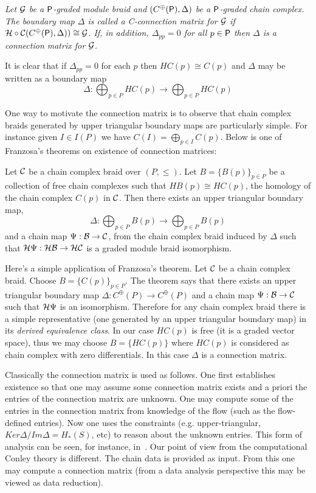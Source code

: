 \begin{defn}
{\em
Let ${\mathcal G}$ be a ${\mathsf P}$-graded module braid and $(C^\oplus({\mathsf P}),\Delta)$ be a ${\mathsf P}$-graded chain complex.  The boundary map $\Delta$ is called a {\em C-connection matrix for} ${\mathcal G}$ if ${\mathcal H}\circ {\mathcal C}(C^\oplus({\mathsf P}),\Delta))\cong {\mathcal G}$.  If, in addition, $\Delta_{pp}=0$ for all $p\in {\mathsf P}$ then $\Delta$ is a {\em connection matrix for} ${\mathcal G}$.
}
\end{defn}

It is clear that if $\Delta_{pp}=0$ for each $p$ then $HC(p)\cong C(p)$ and $\Delta$ may be written as a boundary map $$\Delta:\bigoplus_{p\in P} HC(p)\to \bigoplus_{p\in P} HC(p)$$

One way to motivate the connection matrix is to observe that chain complex braids generated by upper triangular boundary maps are particularly simple.  For instance given $I\in I(P)$ we have $C(I) = \bigoplus_{p\in I} C(p)$.  Below is one of Franzosa's theorems on existence of connection matrices:

\begin{thm}
Let ${\mathcal C}$ be a chain complex braid over $(P,\leq)$.  Let $B=\{B(p)\}_{p\in P}$ be a collection of free chain complexes such that $HB(p) \cong HC(p)$, the homology of the chain complex $C(p)$ in ${\mathcal C}$.  Then there exists an upper triangular boundary map, $$\Delta:\bigoplus_{p\in P} B(p)\to \bigoplus_{p\in P}B(p)$$ and a chain map $\Psi:{\mathcal B}\to {\mathcal C}$, from the chain complex braid induced by $\Delta$ such that ${\mathcal H}\Psi:{\mathcal H}{\mathcal B}\to {\mathcal H}{\mathcal C}$ is a graded module braid isomorphism.
\end{thm}

Here's a simple application of Franzosa's theorem.  Let ${\mathcal C}$ be a chain complex braid.  Choose $B = \{C(p)\}_{p\in P}$.  The theorem says that there exists an upper triangular boundary map $\Delta:C^\oplus(P)\to C^\oplus(P)$ and a chain map $\Psi:{\mathcal B}\to {\mathcal C}$ such that ${\mathcal H}\Psi$ is an isomorphism.  Therefore for any chain complex braid there is a simple representative (one generated by an upper triangular boundary map) in its {\em derived equivalence class}.  In our case $HC(p)$ is free (it is a graded vector space), thus we may choose $B=\{HC(p)\}$ where $HC(p)$ is considered as chain complex with zero differentials.  In this case $\Delta$ is a connection matrix.


\begin{rem}
Classically the connection matrix is used as follows.  One first establishes existence so that one may assume some connection matrix exists and a priori the entries of the connection matrix are unknown.  One may compute some of the entries in the connection matrix from knowledge of the flow (such as the flow-defined entries).  Now one uses the constraints (e.g. upper-triangular, $Ker\Delta/Im\Delta = H_*(S)$, etc) to reason about the unknown entries.  This form of analysis can be seen, for instance, in~\cite{}.  Our point of view from the computational Conley theory is different.  The chain data is provided as input.  From this one may compute a connection matrix (from a data analysis perspective this may be viewed as data reduction). 
\end{rem}


